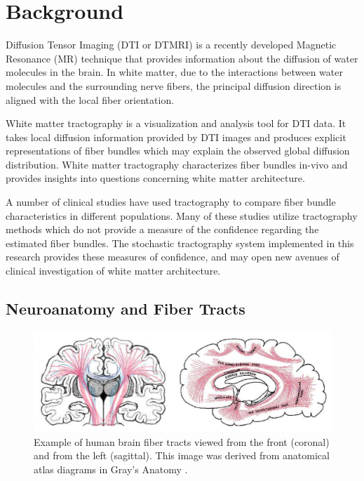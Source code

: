 \chapter{Background}

Diffusion Tensor Imaging (DTI or DTMRI) is a recently developed Magnetic Resonance (MR) technique that provides information about the diffusion of water molecules in the brain.  In white matter, due to the interactions between water molecules and the surrounding nerve fibers, the principal diffusion direction is aligned with the local fiber orientation.

White matter tractography is a visualization and analysis tool for DTI data.  It takes local diffusion information provided by DTI images and produces explicit representations of fiber bundles which may explain the observed global diffusion distribution.  White matter tractography characterizes fiber bundles in-vivo and provides insights into questions concerning white matter architecture.

A number of clinical studies have used tractography to compare fiber bundle characteristics in different populations.  Many of these studies utilize tractography methods which do not provide a measure of the confidence regarding the estimated fiber bundles.  The stochastic tractography system implemented in this research provides these measures of confidence, and may open new avenues of clinical investigation of white matter architecture.

\section{Neuroanatomy and Fiber Tracts}
\begin{figure}
	\includegraphics[width=\linewidth]{graysfibertracts}
	\caption{Example of human brain fiber tracts viewed from the front (coronal) and from the left (sagittal).  This image was derived from anatomical atlas diagrams in Gray's Anatomy \cite{odonnel06}.}
\label{fig:graysfibertracts}
\end{figure}


